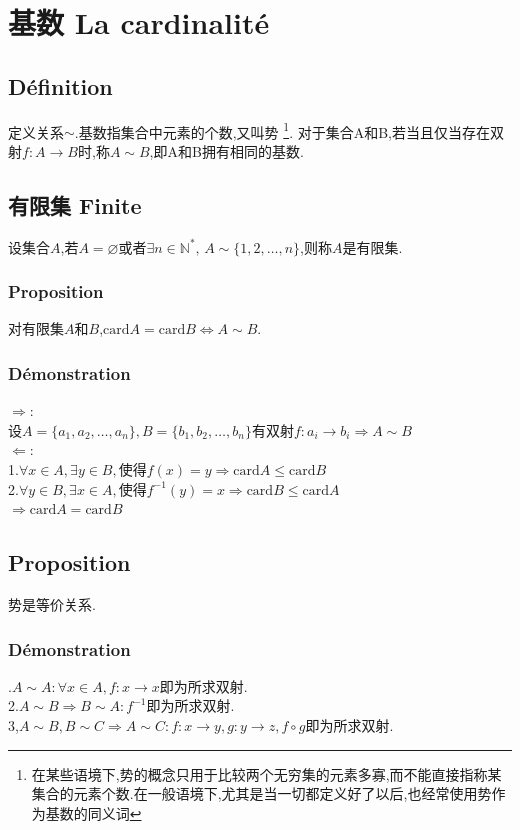 \documentclass[12pt, a4paper, oneside]{ctexbook}
\newcommand{\N }{\mathbb{N}}%
\begin{document}
\section{基数 La cardinalité}
  \subsection{Définition}
  定义关系$\sim$.基数指集合中元素的个数,又叫势
  \footnote{在某些语境下,势的概念只用于比较两个无穷集的元素多寡,而不能直接指称某集合的元素个数.在一般语境下,尤其是当一切都定义好了以后,也经常使用势作为基数的同义词}.
  对于集合A和B,若当且仅当存在双射$f:A\rightarrow B$时,称$A\sim B$,即A和B拥有相同的基数.
  \subsection{有限集 Finite}
  设集合$A$,若$A=\varnothing$或者$\exists n\in\N^*,\,A\sim \{1,2,\dots,n\}$,则称$A$是有限集.
  \subsubsection{Proposition}\label{myref:youxianji}
  对有限集$A$和$B$,$\text{card}A=\text{card}B\Leftrightarrow A\sim B$.
  \subsubsection{Démonstration}
  \noindent $\Rightarrow$:\\
  设$A=\{a_1,a_2,\dots,a_n\},B=\{b_1,b_2,\dots,b_n\}$有双射$f:a_i\rightarrow b_i\Rightarrow A\sim B$\\

  \noindent $\Leftarrow$:\\
  1.$\forall x\in A, \exists y\in B,\text{使得} f(x)=y\Rightarrow\text{card}A\leq\text{card}B$\\
  2.$\forall y\in B, \exists x\in A,\text{使得} f^{-1}(y)=x\Rightarrow\text{card}B\leq\text{card}A$\\
  $\Rightarrow \text{card}A=\text{card}B$
  \subsection{Proposition}\label{myref:carddengjia}
  势是等价关系.
  \subsubsection{Démonstration}
  .$A\sim A:\forall x\in A, f:x\rightarrow x$即为所求双射.\\
  2.$A\sim B\Rightarrow B\sim A: f^{-1}$即为所求双射.\\
  3,$A\sim B,B\sim C\Rightarrow A\sim C:f:x\rightarrow y,g:y\rightarrow z,f\circ g $即为所求双射.\\
  
\end{document}
